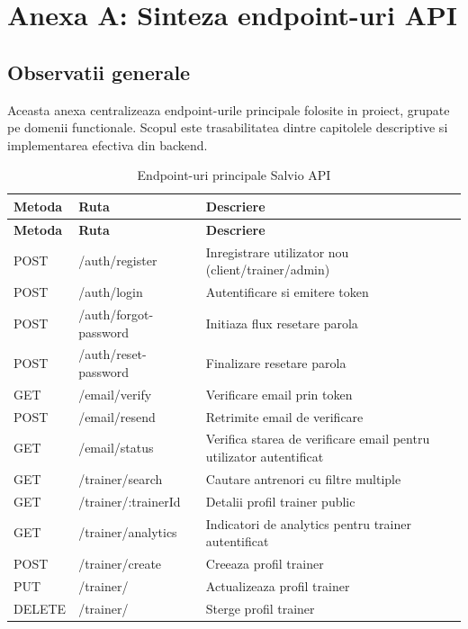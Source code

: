 \chapter{Anexa A: Sinteza endpoint-uri API}

\section{Observatii generale}

Aceasta anexa centralizeaza endpoint-urile principale folosite in proiect, grupate pe domenii functionale. Scopul este trasabilitatea dintre capitolele descriptive si implementarea efectiva din backend.

\begin{longtable}{p{} p{} p{}}
\caption{Endpoint-uri principale Salvio API} \\
\toprule
\textbf{Metoda} & \textbf{Ruta} & \textbf{Descriere} \\
\midrule
\endfirsthead
\toprule
\textbf{Metoda} & \textbf{Ruta} & \textbf{Descriere} \\
\midrule
\endhead

POST & /auth/register & Inregistrare utilizator nou (client/trainer/admin) \\
POST & /auth/login & Autentificare si emitere token \\
POST & /auth/forgot-password & Initiaza flux resetare parola \\
POST & /auth/reset-password & Finalizare resetare parola \\

GET & /email/verify & Verificare email prin token \\
POST & /email/resend & Retrimite email de verificare \\
GET & /email/status & Verifica starea de verificare email pentru utilizator autentificat \\

GET & /trainer/search & Cautare antrenori cu filtre multiple \\
GET & /trainer/:trainerId & Detalii profil trainer public \\
GET & /trainer/analytics & Indicatori de analytics pentru trainer autentificat \\
POST & /trainer/create & Creeaza profil trainer \\
PUT & /trainer/ & Actualizeaza profil trainer \\
DELETE & /trainer/ & Sterge profil trainer \\


\end{longtable}

